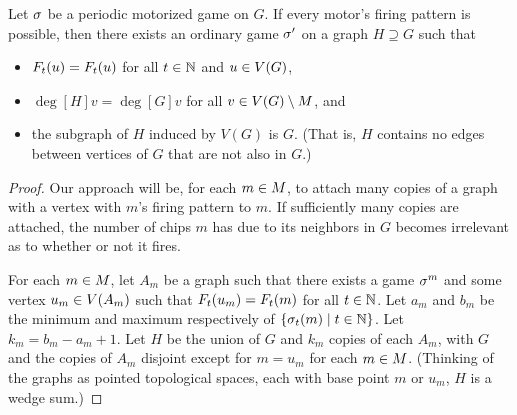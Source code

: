\begin{thm} \label{natMotors}
Let $\s$ be a periodic motorized game on $G$. If every motor's firing pattern
is possible, then there exists an ordinary game $\s'$ on a graph $H \supseteq
G$ such that
\begin{itemize}
\item $\firing[\s']{u}{t} = \firing{u}{t}$ for all $t \in \nats$ and $u \in
  \V$,
\item $\deg[H]{v} = \deg[G]{v}$ for all $v \in \V \setminus \mots$, and
\item the subgraph of $H$ induced by $V(G)$ is $G$. (That is, $H$ contains no
  edges between vertices of $G$ that are not also in $G$.)
\end{itemize}
\end{thm}

\begin{proof}
Our approach will be, for each $m \in \mots$, to attach many copies of a graph
with a vertex with $m$'s firing pattern to $m$. If sufficiently many copies
are attached, the number of chips $m$ has due to its neighbors in $G$ becomes
irrelevant as to whether or not it fires.

For each $m \in \mots$, let $A_m$ be a graph such that there exists a game
$\s^m$ and some vertex $u _m\in \V[A_m]$ such that $\firing[\s^m]{u_m}{t} =
\firing{m}{t}$ for all $t \in \nats$. Let $a_m$ and $b_m$ be the minimum and
maximum respectively of $\set{\chips{m}{t}}{t \in \nats}$. Let $k_m = b_m - a_m
+ 1$. Let $H$ be the union of $G$ and $k_m$ copies of each $A_m$, with $G$ and
the copies of $A_m$ disjoint except for $m = u_m$ for each $m \in
\mots$. (Thinking of the graphs as pointed topological spaces, each with
base point $m$ or $u_m$, $H$ is a wedge sum.)


\end{proof}
